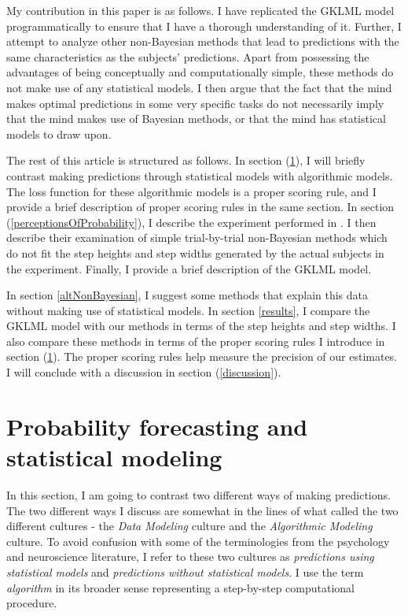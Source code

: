 \documentclass{article}
\begin{document}
My contribution in this paper is as follows. I have replicated the GKLML model programmatically to ensure that I have a thorough understanding of it. Further, I attempt to analyze other non-Bayesian methods that lead to predictions with the same characteristics as the subjects' predictions. Apart from possessing the advantages of being conceptually and computationally simple, these methods do not make use of any statistical models. I then argue that the fact that the mind makes optimal predictions in some very specific tasks do not necessarily imply that the mind makes use of Bayesian methods, or that the mind has statistical models to draw upon.

The rest of this article is structured as follows. In section (\ref{forecastingAndModelling}), I will briefly contrast making predictions through statistical models with algorithmic models. The loss function for these algorithmic models is a proper scoring rule, and I provide a brief description of proper scoring rules in the same section. In section (\ref{perceptionsOfProbability}), I describe the experiment performed in \cite{gallistel2014perception}. I then describe their examination of simple trial-by-trial non-Bayesian methods which do not fit the step heights and step widths generated by the actual subjects in the experiment. Finally, I provide a brief description of the GKLML model.

In section \ref{altNonBayesian}, I suggest some methods that explain this data without making use of statistical models. In section \ref{results}, I compare the GKLML model with our methods in terms of the step heights and step widths. I also compare these methods in terms of the proper scoring rules I introduce in section (\ref{forecastingAndModelling}). The proper scoring rules help measure the precision of our estimates. I will conclude with a discussion in section (\ref{discussion}).

\section{Probability forecasting and statistical modeling}
\label{forecastingAndModelling}
In this section, I am going to contrast two different ways of making predictions. The two different ways I discuss are somewhat in the lines of what \cite{breiman2001statistical} called the two different cultures - the \textit{Data Modeling} culture and the \textit{Algorithmic Modeling} culture. To avoid confusion with some of the terminologies from the psychology and neuroscience literature, I refer to these two cultures as \textit{predictions using statistical models} and \textit{predictions without statistical models}. I use the term \textit{algorithm} in its broader sense representing a step-by-step computational procedure.
\end{document}
